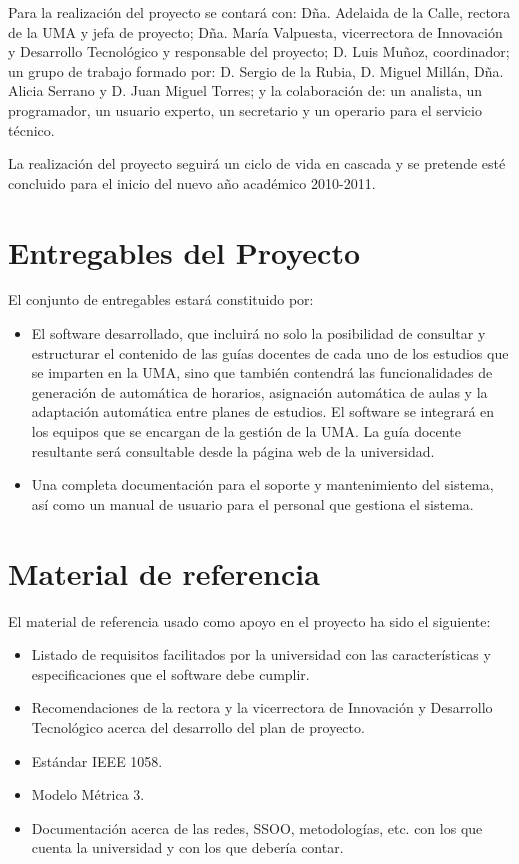 \documentclass[11pt,a4paper,spanish,twoside]{report}
\begin{document}
Para la realización del proyecto se contará con: Dña. Adelaida de la Calle, 
rectora de la UMA y jefa de proyecto; Dña. María Valpuesta, vicerrectora de 
Innovación y Desarrollo Tecnológico y responsable del proyecto; D. Luis 
Muñoz, coordinador; un grupo de trabajo formado por: D. Sergio de la Rubia, 
D. Miguel Millán, Dña. Alicia Serrano y D. Juan Miguel Torres; y la 
colaboración de: un analista, un programador, un usuario experto, un 
secretario y un operario para el servicio técnico.

La realización del proyecto seguirá un ciclo de vida en cascada y se pretende 
esté concluido para el inicio del nuevo año académico 2010-2011.

\section{Entregables del Proyecto}
El conjunto de entregables estará constituido por:
\begin{itemize}
\item El software desarrollado, que incluirá no solo la posibilidad de 
consultar y estructurar el contenido de las guías docentes de cada uno de los 
estudios que se imparten en la UMA, sino que también contendrá las 
funcionalidades de generación de automática de horarios, asignación automática 
de aulas y la adaptación automática entre planes de estudios. El software se 
integrará en los equipos que se encargan de la gestión de la UMA. La guía 
docente resultante será consultable desde la página web de la universidad.
\item Una completa documentación para el soporte y mantenimiento del sistema, 
así como un manual de usuario para el personal que gestiona el sistema.
\end{itemize}

\section{Material de referencia}
El material de referencia usado como apoyo en el proyecto ha sido el siguiente:
\begin{itemize}
\item Listado de requisitos facilitados por la universidad con las 
características y especificaciones que el software debe cumplir.
\item Recomendaciones de la rectora y la vicerrectora de Innovación y 
Desarrollo Tecnológico acerca del desarrollo del plan de proyecto.
\item Estándar IEEE 1058.
\item Modelo Métrica 3.
\item Documentación acerca de las redes, SSOO, metodologías, etc. con los que 
cuenta la universidad y con los que debería contar.
\end{itemize}
\end{document}
